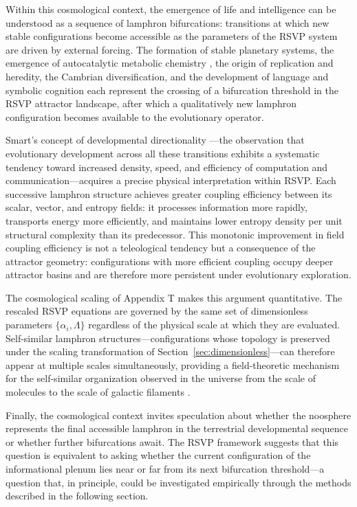 \documentclass[12pt]{article}
\begin{document}
Within this cosmological context, the emergence of life and intelligence can be understood as a sequence of lamphron bifurcations: transitions at which new stable configurations become accessible as the parameters of the RSVP system are driven by external forcing. The formation of stable planetary systems, the emergence of autocatalytic metabolic chemistry \cite{smithmorowitz2016}, the origin of replication and heredity, the Cambrian diversification, and the development of language and symbolic cognition each represent the crossing of a bifurcation threshold in the RSVP attractor landscape, after which a qualitatively new lamphron configuration becomes available to the evolutionary operator.

Smart's concept of developmental directionality \cite{smart2009,smart2023}---the observation that evolutionary development across all these transitions exhibits a systematic tendency toward increased density, speed, and efficiency of computation and communication---acquires a precise physical interpretation within RSVP. Each successive lamphron structure achieves greater coupling efficiency between its scalar, vector, and entropy fields: it processes information more rapidly, transports energy more efficiently, and maintains lower entropy density per unit structural complexity than its predecessor. This monotonic improvement in field coupling efficiency is not a teleological tendency but a consequence of the attractor geometry: configurations with more efficient coupling occupy deeper attractor basins and are therefore more persistent under evolutionary exploration.

The cosmological scaling of Appendix T makes this argument quantitative. The rescaled RSVP equations are governed by the same set of dimensionless parameters $\{\alpha_i, \Lambda\}$ regardless of the physical scale at which they are evaluated. Self-similar lamphron structures---configurations whose topology is preserved under the scaling transformation of Section~\ref{sec:dimensionless}---can therefore appear at multiple scales simultaneously, providing a field-theoretic mechanism for the self-similar organization observed in the universe from the scale of molecules to the scale of galactic filaments \cite{bak1996,goldenfeld1992}.

Finally, the cosmological context invites speculation about whether the noosphere represents the final accessible lamphron in the terrestrial developmental sequence or whether further bifurcations await. The RSVP framework suggests that this question is equivalent to asking whether the current configuration of the informational plenum lies near or far from its next bifurcation threshold---a question that, in principle, could be investigated empirically through the methods described in the following section.
\end{document}

